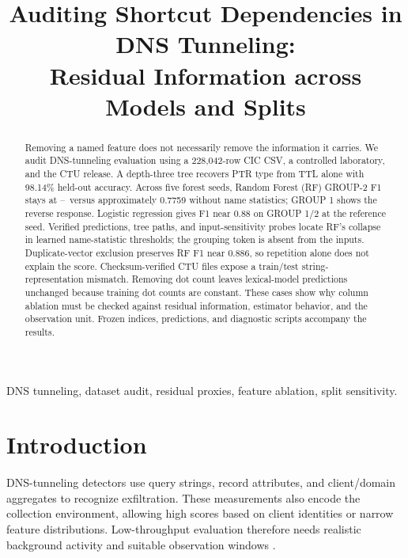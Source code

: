 \documentclass[conference]{IEEEtran}
\begin{document}
\title{Auditing Shortcut Dependencies in DNS Tunneling:\\Residual Information across Models and Splits}
\author{
}
\maketitle
\begin{abstract}
Removing a named feature does not necessarily remove the information it carries. We audit DNS-tunneling evaluation using a 228,042-row CIC CSV, a controlled laboratory, and the CTU release. A depth-three tree recovers PTR type from TTL alone with 98.14\% held-out accuracy. Across five forest seeds, Random Forest (RF) GROUP-2 F1 stays at \SeedTwoFullMin--\SeedTwoFullMax\ versus approximately 0.7759 without name statistics; GROUP 1 shows the reverse response. Logistic regression gives F1 near 0.88 on GROUP 1/2 at the reference seed. Verified predictions, tree paths, and input-sensitivity probes locate RF's collapse in learned name-statistic thresholds; the grouping token is absent from the inputs. Duplicate-vector exclusion preserves RF F1 near 0.886, so repetition alone does not explain the score. Checksum-verified CTU files expose a train/test string-representation mismatch. Removing dot count leaves lexical-model predictions unchanged because training dot counts are constant. These cases show why column ablation must be checked against residual information, estimator behavior, and the observation unit. Frozen indices, predictions, and diagnostic scripts accompany the results.
\end{abstract}
\begin{IEEEkeywords}
DNS tunneling, dataset audit, residual proxies, feature ablation, split sensitivity.
\end{IEEEkeywords}

\section{Introduction}
DNS-tunneling detectors use query strings, record attributes, and client/domain aggregates to recognize exfiltration. These measurements also encode the collection environment, allowing high scores based on client identities or narrow feature distributions. Low-throughput evaluation therefore needs realistic background activity and suitable observation windows \cite{nadler}.
\end{document}
